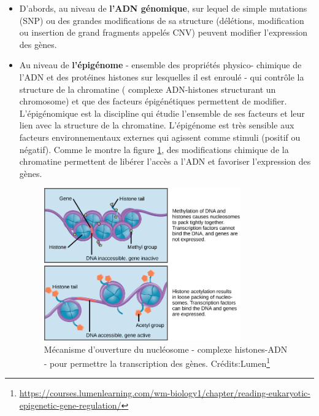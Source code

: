 \begin{itemize}
    \item D'abords, au niveau de \textbf{l'ADN génomique}, sur lequel de simple mutations (SNP) ou des grandes modifications de sa structure (délétions, modification ou insertion de grand fragments appelés CNV) peuvent modifier l'expression des gènes.\\
    
    \item  Au niveau de \textbf{l'épigénome} - ensemble des propriétés physico- chimique de l'ADN et des protéines histones sur lesquelles il est enroulé - qui contrôle la structure de la chromatine ( complexe ADN-histones structurant un chromosome) et que des facteurs épigénétiques permettent de modifier. L'épigénomique est la discipline qui étudie l'ensemble de ses facteurs et leur lien avec la structure de la chromatine. L'épigénome est très sensible aux facteurs environnementaux externes qui agissent comme stimuli (positif ou négatif). Comme le montre la figure \ref{fig:epigenet}, des modifications chimique de la chromatine permettent de libérer l'accès a l'ADN et favoriser l'expression des gènes.
    
    \begin{figure}[!ht]
    \centering
    \includegraphics[width=0.8\textwidth]{hdr_manuscript/Figures/epigenet.png}
    \caption{Mécanisme d'ouverture du nucléosome - complexe histones-ADN - pour permettre la transcription des gènes. Crédits:Lumen\footnote{\url{https://courses.lumenlearning.com/wm-biology1/chapter/reading-eukaryotic-epigenetic-gene-regulation/}}}
    \label{fig:epigenet}
\end{figure}


\end{itemize}
